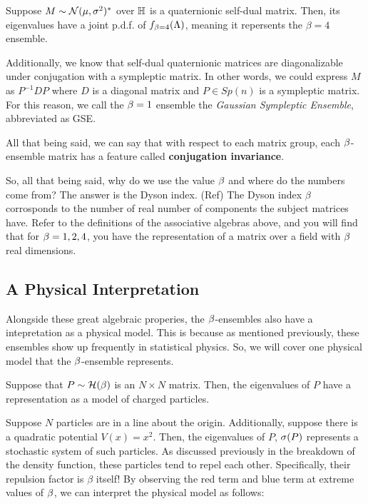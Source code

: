 \bigskip

 Suppose $M \sim \mathcal{N}(\mu,\sigma^2)^*$ over $\mathbb{H}$ is a quaternionic self-dual matrix.
Then, its eigenvalues have a joint p.d.f. of $f_{\beta = 4}(\Lambda)$, meaning it repersents the $\beta = 4$ ensemble.

Additionally, we know that self-dual quaternionic matrices are diagonalizable under conjugation with a sympleptic matrix.
In other words, we could express $M$ as $P^{-1} D P$ where $D$ is a diagonal matrix and $P \in Sp(n)$ is a sympleptic matrix.
For this reason, we call the $\beta = 1$ ensemble the \textit{Gaussian Sympleptic Ensemble}, abbreviated as GSE.

\bigskip

All that being said, we can say that with respect to each matrix group, each $\beta$-ensemble matrix has a feature called
\textbf{conjugation invariance}.

\newpage

So, all that being said, why do we use the value $\beta$ and where do the numbers come from? The answer is the Dyson index. (Ref)
The Dyson index $\beta$ corrosponds to the number of real number of components the subject matrices have. Refer to the definitions
of the associative algebras above, and you will find that for $\beta = 1,2,4$, you have the representation of a matrix over a field with $\beta$ real dimensions.


\newpage
\subsection{A Physical Interpretation}

Alongside these great algebraic properies, the $\beta$-ensembles also have a intepretation as a physical model.
This is because as mentioned previously, these ensembles show up frequently in statistical physics.
So, we will cover one physical model that the $\beta$-ensemble represents.

Suppose that $P \sim \mathcal{H}(\beta)$ is an $N \times N$ matrix. Then, the eigenvalues of $P$ have a representation as a model of charged particles.


Suppose $N$ particles are in a line about the origin. Additionally, suppose there is a quadratic potential $V(x) = x^2$.
Then, the eigenvalues of $P$, $\sigma(P)$ represents a stochastic system of such particles. As discussed previously in the breakdown of the density function,
these particles tend to repel each other. Specifically, their repulsion factor is $\beta$ itself! By observing the red term and blue term at extreme values of $\beta$,
we can interpret the physical model as follows:
\medskip

